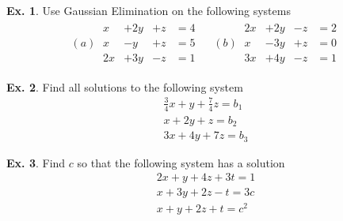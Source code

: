\documentclass[10pt,a4paper]{book}
\theoremstyle{definition}\newtheorem{definition}{Definition}
\theoremstyle{definition}\newtheorem{fact}{Fact}
\theoremstyle{definition}\newtheorem{ex}{Ex.}
\theoremstyle{definition}\newtheorem{project}{Project}
\theoremstyle{definition}\newtheorem{problem}{Problem}
\theoremstyle{definition}\newtheorem{example}{Example}
\numberwithin{theorem}{chapter}
\numberwithin{corollary}{chapter}
\numberwithin{assumption}{chapter}
\numberwithin{definition}{chapter}
\numberwithin{prop}{chapter}
\numberwithin{notation}{chapter}
\numberwithin{problem}{chapter}
\numberwithin{example}{chapter}
\numberwithin{fact}{chapter}
\numberwithin{ex}{chapter}
\begin{document}
	\begin{ex} \label{ex:gaussian}
		Use Gaussian Elimination on the following systems
		\begin{align*}
			(a) \  \begin{matrix}
				x  & + 2y & +z & = 4 \\
				x  & - y  & +z & =5  \\
				2x & +3y  & -z & =1  
			\end{matrix}  \ & \
			(b) \ \begin{matrix}
				2x & + 2y & -z & =2  \\
				x  & -3y  & +z & =0  \\
				3x & +4y  & -z & =1  
			\end{matrix} 
		\end{align*}
	\end{ex}
	
	\begin{ex}
		Find all solutions to the following system
		\begin{align*}
			\frac{3}{4} x + y + \frac{7}{4} z = b_1 \\
			x + 2y + z = b_2                        \\
			3x + 4y + 7z = b_3                      
		\end{align*}
	\end{ex}
	
	\begin{ex}
		Find $c$ so that the following system has a solution
		\begin{align*}
			2x + y + 4z + 3t = 1  \\
			x + 3y + 2z - t = 3c  \\
			x + y + 2z + t = c^2  \\
		\end{align*}
	\end{ex}
	
\end{document}
